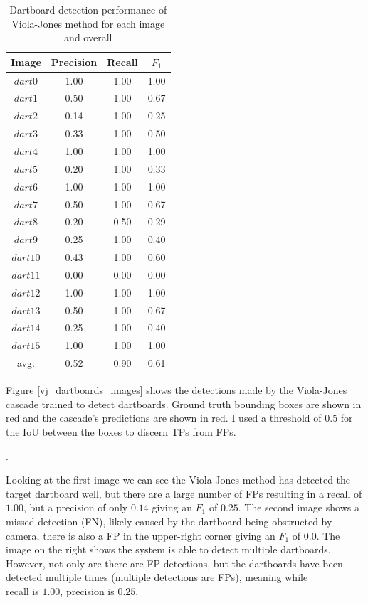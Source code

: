 \documentclass[11pt]{article}
\begin{document}
\begin{table}
\begin{tabular}{|c||c|c|c|} 
     \hline
     Image & Precision & Recall & $F_1$ \\ [0.5ex] 
     \hline
     $dart0$  & 1.00 & 1.00 & 1.00 \\ 
     $dart1$  & 0.50 & 1.00 & 0.67 \\ 
     $dart2$  & 0.14 & 1.00 & 0.25 \\ 
     $dart3$  & 0.33 & 1.00 & 0.50 \\ 
     $dart4$  & 1.00 & 1.00 & 1.00 \\ 
     $dart5$  & 0.20 & 1.00 & 0.33 \\  
     $dart6$  & 1.00 & 1.00 & 1.00 \\  
     $dart7$  & 0.50 & 1.00 & 0.67 \\  
     $dart8$  & 0.20 & 0.50 & 0.29 \\ 
     $dart9$  & 0.25 & 1.00 & 0.40 \\ 
     $dart10$ & 0.43 & 1.00 & 0.60 \\ 
     $dart11$ & 0.00 & 0.00 & 0.00 \\
     $dart12$ & 1.00 & 1.00 & 1.00 \\  
     $dart13$ & 0.50 & 1.00 & 0.67 \\  
     $dart14$ & 0.25 & 1.00 & 0.40 \\  
     $dart15$ & 1.00 & 1.00 & 1.00 \\
     \hline\hline
     avg.  & 0.52 & 0.90 & 0.61 \\
     \hline
\end{tabular}
\caption{Dartboard detection performance of Viola-Jones method for each image and overall}
\label{vj_dartboards_results}
\end{table} 

Figure \ref{vj_dartboards_images} shows the detections made by the Viola-Jones cascade trained to detect dartboards. Ground truth bounding boxes are shown in red and the cascade's predictions are shown in red. I used a threshold of $0.5$ for the IoU between the boxes to discern TPs from FPs.

{\color{white}.}

Looking at the first image we can see the Viola-Jones method has detected the target dartboard well, but there are a large number of FPs resulting in a recall of $1.00$, but a precision of only $0.14$ giving an $F_1$ of $0.25$. The second image shows a missed detection (FN), likely caused by the dartboard being obstructed by camera, there is also a FP in the upper-right corner giving an $F_1$ of $0.0$. The image on the right shows the system is able to detect multiple dartboards. However, not only are there are FP detections, but the dartboards have been detected multiple times (multiple detections are FPs), meaning while \\ recall is $1.00$, precision is $0.25$.
\end{document}
